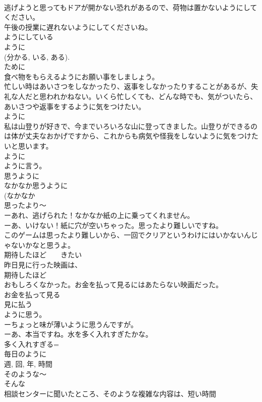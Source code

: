 \documentclass[8pt]{extreport}
\begin{document}
\begin{CJK}{UTF8}{min}
\\	逃げようと思ってもドアが開かない恐れがあるので、荷物は置かないようにしてください。
\\	午後の授業に遅れないようにしてくださいね。
\\	ようにしている
\\	ように
\\	(分かる, いる, ある). 
\\	ために 
\\	食べ物をもらえるようにお願い事をしましょう。
\\	忙しい時はあいさつをしなかったり、返事をしなかったりすることがあるが、失礼な人だと思われかねない。いくら忙しくても、どんな時でも、気がついたら、あいさつや返事をするように気をつけたい。
\\	ように
\\	私は山登りが好きで、今までいろいろな山に登ってきました。山登りができるのは体が丈夫なおかげですから、これからも病気や怪我をしないように気をつけたいと思います。
\\	ように
\\	ように言う。
\\	思うように
\\	なかなか思うように
\\	(なかなか 
\\	思ったより～
\\	ーあれ、逃げられた！なかなか紙の上に乗ってくれません。
\\	ーあ、いけない！紙に穴が空いちゃった。思ったより難しいですね。
\\	このゲームは思ったより難しいから、一回でクリアというわけにはいかないんじゃないかなと思うよ。
\\	期待したほど　　きたい
\\	昨日見に行った映画は、
\\	期待したほど
\\	おもしろくなかった。お金を払って見るにはあたらない映画だった。
\\	お金を払って見る
\\	見に払う
\\	ように思う。
\\	ーちょっと味が薄いように思うんですが。
\\	ーあ、本当ですね。水を多く入れすぎたかな。
\\	多く入れすぎる=
\\	毎日のように
\\	週, 回, 年, 時間
\\	そのような～
\\	そんな
\\	相談センターに聞いたところ、そのような複雑な内容は、短い時間

\end{CJK}
\end{document}

